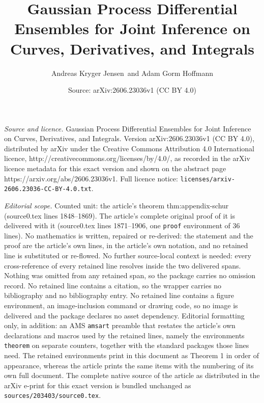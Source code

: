 \documentclass[10pt,a4paper]{amsart}
\title{Gaussian Process Differential Ensembles for Joint Inference on Curves, Derivatives, and Integrals}
\author{Andreas Kryger Jensen\, and Adam Gorm Hoffmann}
\date{Source: arXiv:2606.23036v1 (CC BY 4.0)}
\begin{document}
\maketitle

\noindent\emph{Source and licence.} Gaussian Process Differential Ensembles for Joint Inference on Curves, Derivatives, and Integrals. Version arXiv:2606.23036v1 (CC BY 4.0), distributed by arXiv under the Creative Commons Attribution 4.0 International licence, http://creativecommons.org/licenses/by/4.0/, as recorded in the arXiv licence metadata for this exact version and shown on the abstract page https://arxiv.org/abs/2606.23036v1. Full licence notice: \texttt{licenses/arxiv-2606.23036-CC-BY-4.0.txt}.\par\smallskip

\noindent\textit{Editorial scope.} Counted unit: the article's theorem thm:appendix-schur (source0.tex lines 1848--1869). The article's complete original proof of it is delivered with it (source0.tex lines 1871--1906, one \texttt{proof} environment of 36 lines). No mathematics is written, repaired or re-derived: the statement and the proof are the article's own lines, in the article's own notation, and no retained line is substituted or re-flowed.  No further source-local context is needed: every cross-reference of every retained line resolves inside the two delivered spans.  Nothing was omitted from any retained span, so the package carries no omission record.  No retained line contains a citation, so the wrapper carries no bibliography and no bibliography entry.  No retained line contains a figure environment, an image-inclusion command or drawing code, so no image is delivered and the package declares no asset dependency.  Editorial formatting only, in addition: an AMS \texttt{amsart} preamble that restates the article's own declarations and macros used by the retained lines, namely the environments \texttt{theorem} on separate counters, together with the standard packages those lines need.  The retained environments print in this document as Theorem 1 in order of appearance, whereas the article prints the same items with the numbering of its own full document.  The complete native source of the article as distributed in the arXiv e-print for this exact version is bundled unchanged as \texttt{sources/203403/source0.tex}.
\end{document}
